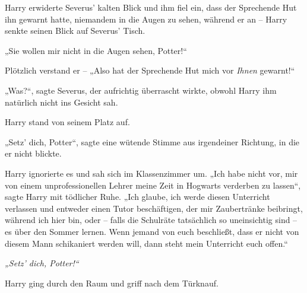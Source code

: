 Harry erwiderte Severus’ kalten Blick und ihm fiel ein, dass der Sprechende Hut ihn gewarnt hatte, niemandem in die Augen zu sehen, während er an – Harry senkte seinen Blick auf Severus’ Tisch. 

„Sie wollen mir nicht in die Augen sehen, Potter!“ 

Plötzlich verstand er – „Also hat der Sprechende Hut mich vor \emph{Ihnen} gewarnt!“ 

„Was?“, sagte Severus, der aufrichtig überrascht wirkte, obwohl Harry ihm natürlich nicht ins Gesicht sah. 

Harry stand von seinem Platz auf. 

„Setz’ dich, Potter“, sagte eine wütende Stimme aus irgendeiner Richtung, in die er nicht blickte. 

Harry ignorierte es und sah sich im Klassenzimmer um. „Ich habe nicht vor, mir von einem unprofessionellen Lehrer meine Zeit in Hogwarts verderben zu lassen“, sagte Harry mit tödlicher Ruhe. „Ich glaube, ich werde diesen Unterricht verlassen und entweder einen Tutor beschäftigen, der mir Zaubertränke beibringt, während ich hier bin, oder – falls die Schulräte tatsächlich so uneinsichtig sind – es über den Sommer lernen. Wenn jemand von euch beschließt, dass er nicht von diesem Mann schikaniert werden will, dann steht mein Unterricht euch offen.“ 

\emph{„Setz’ dich, Potter!“} 

Harry ging durch den Raum und griff nach dem Türknauf. 

